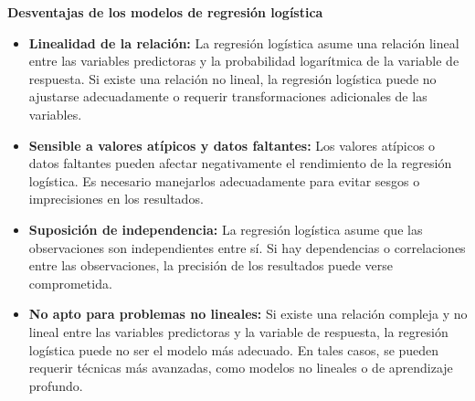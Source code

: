 \textbf{Desventajas de los modelos de regresión logística}

\begin{itemize}
    \item \textbf{Linealidad de la relación:} La regresión logística asume una relación lineal entre las variables predictoras y la probabilidad logarítmica de la variable de respuesta. Si existe una relación no lineal, la regresión logística puede no ajustarse adecuadamente o requerir transformaciones adicionales de las variables.
    \item \textbf{Sensible a valores atípicos y datos faltantes:} Los valores atípicos o datos faltantes pueden afectar negativamente el rendimiento de la regresión logística. Es necesario manejarlos adecuadamente para evitar sesgos o imprecisiones en los resultados.
    \item \textbf{Suposición de independencia:} La regresión logística asume que las observaciones son independientes entre sí. Si hay dependencias o correlaciones entre las observaciones, la precisión de los resultados puede verse comprometida.
    \item \textbf{No apto para problemas no lineales:} Si existe una relación compleja y no lineal entre las variables predictoras y la variable de respuesta, la regresión logística puede no ser el modelo más adecuado. En tales casos, se pueden requerir técnicas más avanzadas, como modelos no lineales o de aprendizaje profundo.
\end{itemize}